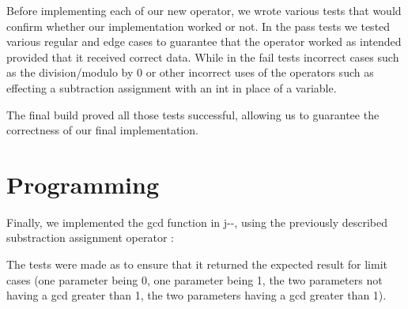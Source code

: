 \documentclass{article}
\begin{document}
    Before implementing each of our new operator, we wrote various tests that would 
    confirm whether our implementation worked or not. In the pass tests we tested various
    regular and edge cases to guarantee that the operator worked as intended provided that it
    received correct data. While in the fail tests incorrect cases such as the 
    division/modulo by 0 or other incorrect uses of the operators such as 
    effecting a subtraction assignment with an int in place of a variable. \newline
    
    The final build proved all those tests successful, allowing us 
    to guarantee the correctness of our final implementation.
    
    \section{Programming}
    
    Finally, we implemented the gcd function in j-\phantom{}-, using the previously described 
    substraction assignment operator :
    
    
    
    The tests were made as to ensure that it returned the expected result for
    limit cases (one parameter being 0, one parameter being 1, the two
    parameters not having a gcd greater than 1, the two parameters having
    a gcd greater than 1).
\end{document}
